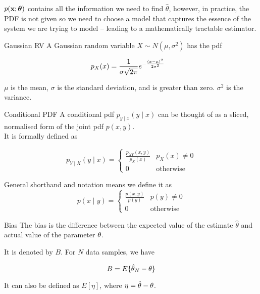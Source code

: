 $p(\mathbf{x};\boldsymbol{\theta})$ contains all the information we need to find $\hat{\theta}$, however, in practice, the PDF is not given so we need to choose a model that captures the essence of the system we are trying to model – leading to a mathematically tractable estimator.

\begin{definitionbox}{Gaussian RV}
A Gaussian random variable $X \sim N(\mu, \sigma^2)$ has the pdf

\begin{equation}
\begin{aligned}p_X(x)&=\frac1{\sigma\sqrt{2\pi}}e^{\large-\frac{(x-\mu)^2}{2\sigma^2}}\end{aligned}
\end{equation}

$\mu$ is the mean, $\sigma$ is the standard deviation, and is greater than zero. $\sigma^2$ is the variance.
\end{definitionbox}

\begin{definitionbox}{Conditional PDF}
A conditional pdf $p_{y \mid x}(y\mid x) $ can be thought of as a sliced, normalised form of the joint pdf $p(x,y)$.\\

It is formally defined as 

\begin{equation}
    p_{Y\mid X}(y \mid x) = \begin{cases}
    \frac{p_{XY}(x,y)}{p_X(x)}& p_X(x) \neq 0
        \\ 0 & \text{otherwise}
    \end{cases}
\end{equation}

General shorthand and notation means we define it as
\begin{equation}
    p(x \mid y) = \begin{cases}
    \frac{p(x,y)}{p(y)}& p(y) \neq 0
        \\ 0 & \text{otherwise}
    \end{cases}
\end{equation}

\end{definitionbox}

\begin{definitionbox}{Bias}
The bias is the difference between the expected value of the estimate $\hat{\theta}$ and actual value of the parameter $\theta$.

It is denoted by $B$. For $N$ data samples, we have

\begin{equation}
    B = E\{\hat{\theta}_N - \theta\}
\end{equation}

It can also be defined as $E[\eta]$, where $\eta = \hat{\theta} - \theta$.

\end{definitionbox}

